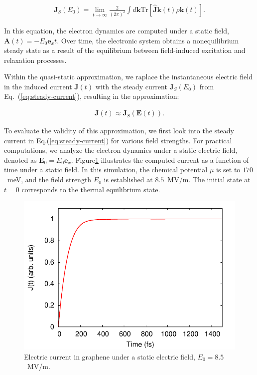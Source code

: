 \begin{align}
	\mathbf J_S(E_0) = \lim_{t\rightarrow \infty}\frac{2}{(2\pi)^2}\int d\mathbf k \mathrm{Tr}\left[\hat{\boldsymbol{J}}{\boldsymbol{k}}(t)\rho{\boldsymbol{k}}(t)\right].
	\label{eq:steady-current}
\end{align}

In this equation, the electron dynamics are computed under a static field, $\mathbf{A}(t)=-E_0
	\mathbf{e}_x t$. Over time, the electronic system obtains a nonequilibrium steady state as a result
of the equilibrium between field-induced excitation and relaxation processes.

Within the quasi-static approximation, we raplace the instantaneous electric field in the induced current $\mathbf J(t)$ with the steady current $\mathbf J_S(E_0)$ from Eq.~(\ref{eq:steady-current}), resulting in the approximation:

\begin{align}
	\mathbf J(t)\approx \mathbf J_S\left( \mathbf E(t) \right).
	\label{eq:appendix-steady-current}
\end{align}

To evaluate the validity of this approximation, we first look into the steady current in
Eq.(\ref{eq:steady-current}) for various field strengths. For practical computations, we analyze
the electron dynamics under a static electric field, denoted as $\mathbf E_0=E_0\mathbf e_x$.
Figure\ref{fig:steady} illustrates the computed current as a function of time under a static field. In this simulation, the chemical potential $\mu$ is set to $170$~meV, and the field strength $E_0$ is established at $8.5$~MV/m. The initial state at $t=0$ corresponds to the thermal equilibrium state.
\begin{figure}[htbp]
	\centering
	\includegraphics[width=0.8\linewidth]{pic/steady_current_appendix.pdf}
	\caption{\label{fig:steady}
		Electric current in graphene under a static electric field, $E_0=8.5$~MV/m.}
\end{figure}

